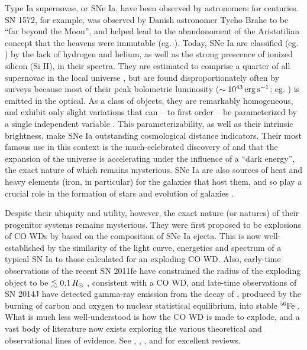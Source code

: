 
Type Ia supernovae, or SNe Ia, have been observed by astronomers for centuries.  SN 1572, for example, was observed by Danish astronomer Tycho Brahe to be ``far beyond the Moon'', and helped lead to the abandonoment of the Aristotilian concept that the heavens were immutable (eg. \citealt{ruiz04, krau+08}).  Today, SNe Ia are classified (eg. \citealt{fili97, li+11}) by the lack of hydrogen and helium, as well as the strong prescence of ionized silicon (Si II), in their spectra.  They are estimated to comprise a quarter of all supernovae in the local universe \citep{li+11}, but are found disproportionately often by surveys because most of their peak bolometric luminosity ($\sim10^{43}\,\ergpsec$; eg. \citealt{fili97, li+11}) is emitted in the optical.  As a class of objects, they are remarkably homogeneous, and exhibit only slight variations that can -- to first order -- be parameterized by a single independent variable \citep{hilln00, howe11}.  This parameterizability, as well as their intrinsic brightness, make SNe Ia outstanding cosmological distance indicators.  Their most famous use in this context is the much-celebrated discovery of \citep{ries98} and \cite{perl99} that the expansion of the universe is accelerating under the influence of a ``dark energy'', the exact nature of which remains mysterious.  SNe Ia are also sources of heat and heavy elements (iron, in particular) for the galaxies that host them, and so play a crucial role in the formation of stars and evolution of galaxies \citep{leib00}.

Despite their ubiquity and utility, however, the exact nature (or natures) of their progenitor systems remains mysterious.  They were first proposed to be explosions of CO WDs by \citep{hoylf60} based on the composition of SNe Ia ejecta.  This is now well-established by the similarity of the light curve, energetics and spectrum of a typical SN Ia to those calculated for an exploding CO WD.  Also, early-time observations of the recent SN 2011fe have constrained the radius of the exploding object to be $\lesssim0.1\,\Rsun$ \citep{nuge+11, bloo+12, maozmn14}, consistent with a CO WD, and late-time observations of SN 2014J have detected gamma-ray emission from the decay of \Ni, produced by the burning of carbon and oxygen to nuclear statistical equilibrium, into stable $^{56}$Fe \citep{chur+14}.  What is much less well-understood is how the CO WD is made to explode, and a vast body of literature now exists exploring the various theoretical and observational lines of evidence.  See \cite{howe11}, \cite{hill+13}, \cite{maozmn14}, and \cite{tsebs15} for excellent reviews.

